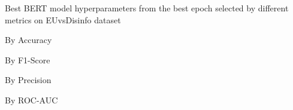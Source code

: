 \begin{table}[!htbp]
    \caption{Best BERT model hyperparameters from the best epoch selected by different metrics on EUvsDisinfo dataset}
    \label{tab:euvsdisinfo_bert_hparams}
    \centering

    \begin{subtable}[t]{0.48\linewidth}
        \scriptsize
        \caption{By Accuracy}
        
    \end{subtable}
    \hfill
    \begin{subtable}[t]{0.48\linewidth}
        \scriptsize
        \caption{By F1-Score}
        
    \end{subtable}

    \vspace{1em}

    \begin{subtable}[t]{0.48\linewidth}
        \scriptsize
        \caption{By Precision}
        
    \end{subtable}
    \hfill
    \begin{subtable}[t]{0.48\linewidth}
        \scriptsize
        \caption{By ROC-AUC}
        
    \end{subtable}


\end{table}